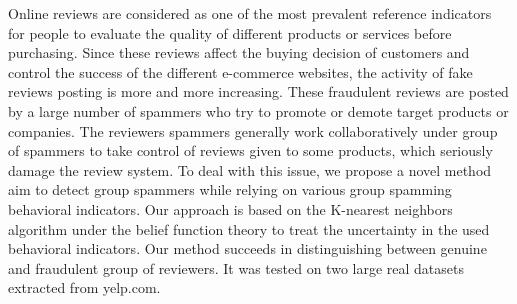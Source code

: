 
\emph{}
Online reviews are considered as one of the most prevalent reference indicators for people to evaluate the quality of different products or services before purchasing. Since these reviews affect the buying decision of customers and control the success of the different e-commerce websites, the activity of fake reviews posting is more and more increasing. These fraudulent reviews are posted by a large number of spammers who try to promote or demote target products or companies. The reviewers spammers generally work collaboratively under group of spammers to take control of reviews given to some products, which seriously damage the review system. To deal with this issue, we propose a novel method aim to detect group spammers while relying on various group spamming behavioral indicators. Our approach is based on the K-nearest neighbors algorithm under the belief function theory to treat the uncertainty in the used behavioral indicators. Our method succeeds in distinguishing between genuine and fraudulent group of reviewers. It was tested on two large real datasets extracted from yelp.com.


